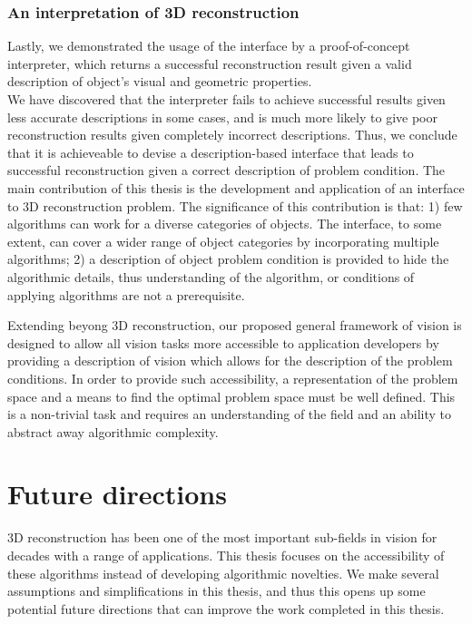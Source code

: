 \subsubsection{An interpretation of 3D reconstruction}
Lastly, we demonstrated the usage of the interface by a proof-of-concept interpreter, which returns a successful reconstruction result given a valid description of object's visual and geometric properties.\\

We have discovered that the interpreter fails to achieve successful results given less accurate descriptions in some cases, and is much more likely to give poor reconstruction results given completely incorrect descriptions. Thus, we conclude that it is achieveable to devise a description-based interface that leads to successful reconstruction given a correct description of problem condition. The main contribution of this thesis is the development and application of an interface to 3D reconstruction problem. The significance of this contribution is that: 1) few algorithms can work for a diverse categories of objects. The interface, to some extent, can cover a wider range of object categories by incorporating multiple algorithms; 2) a description of object problem condition is provided to hide the algorithmic details, thus understanding of the algorithm, or conditions of applying algorithms are not a prerequisite.

Extending beyong 3D reconstruction, our proposed general framework of vision is designed to allow all vision tasks more accessible to application developers by providing a description of vision which allows for the description of the problem conditions. In order to provide such accessibility, a representation of the problem space and a means to find the optimal problem space must be well defined. This is a non-trivial task and requires an understanding of the field and an ability to abstract away algorithmic complexity.

\section{Future directions}
3D reconstruction has been one of the most important sub-fields in vision for decades with a range of applications. This thesis focuses on the accessibility of these algorithms instead of developing algorithmic novelties. We make several assumptions and simplifications in this thesis, and thus this opens up some potential future directions that can improve the work completed in this thesis.

